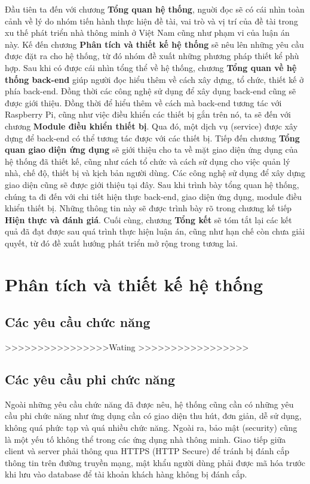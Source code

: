 \documentclass[12pt,a4paper,oneside]{extbook}
\begin{document}
Đầu tiên ta đến với chương \textbf{Tổng quan hệ thống}, nguời đọc sẽ có cái nhìn toàn cảnh về lý do nhóm tiến hành thực hiện đề tài, vai trò và vị trí của đề tài trong xu thế phát triển nhà thông minh ở Việt Nam cũng như phạm vi của luận án này. Kế đến chương \textbf{Phân tích và thiết kế hệ thống} sẽ nêu lên những yêu cầu được đặt ra cho hệ thống, từ đó nhóm đề xuất những phương pháp thiết kể phù hợp. Sau khi có được cái nhìn tổng thể về hệ thống, chương \textbf{Tổng quan về hệ thống back-end} giúp người đọc hiểu thêm về cách xây dựng, tổ chức, thiết kế ở phía back-end. Đồng thời các công nghệ sử dụng để xây dụng back-end cũng sẽ được giới thiệu. Đồng thời để hiểu thêm về cách mà back-end tương tác với Raspberry Pi, cũng như việc điều khiển các thiết bị gắn trên nó, ta sẽ đến với chương \textbf{Module điều khiển thiết bị}. Qua đó, một dịch vụ (service) được xây dựng để back-end có thể tương tác được với các thiết bị. Tiếp đến chương \textbf{Tổng quan giao diện ứng dụng} sẽ giới thiệu cho ta về mặt giao diện ứng dụng của hệ thống đã thiết kế, cũng như cách tổ chức và cách sử dụng cho việc quản lý nhà, chế độ, thiết bị và kịch bản người dùng. Các công nghệ sử dụng để xây dựng giao diện cũng sẽ được giới thiệu tại đây. Sau khi trình bày tổng quan hệ thống, chúng ta đi đến với chi tiết hiện thực back-end, giao diện ứng dụng, module điều khiển thiết bị. Những thông tin này sẽ được trình bày rõ trong chương kế tiếp \textbf{Hiện thực và đánh giá}. Cuối cùng, chương \textbf{Tổng kết} sẽ tóm tắt lại các kết quả đã đạt được sau quá trình thực hiện luận án, cũng như hạn chế còn chưa giải quyết, từ đó đề xuất hướng phát triển mở rộng trong tương lai.
\chapter{Phân tích và thiết kế hệ thống}

\section{Các yêu cầu chức năng}

>>>>>>>>>>>>>>>>Wating >>>>>>>>>>>>>>>>>

\section{Các yêu cầu phi chức năng}

Ngoài những yêu cầu chức năng đã được nêu, hệ thống cũng cần có những yêu cầu phi chức năng như ứng dụng cần có giao diện thu hút, đơn giản, dễ sử dụng, không quá phức tạp và quá nhiều chức năng. Ngoài ra, bảo mật (security) cũng là một yếu tố không thể trong các ứng dụng nhà thông minh. Giao tiếp giữa client và server phải thông qua HTTPS (HTTP Secure) để tránh bị đánh cắp thông tin trên đường truyền mạng, mật khẩu người dùng phải được mã hóa trước khi lưu vào database để tài khoản khách hàng không bị đánh cắp.
\end{document}
